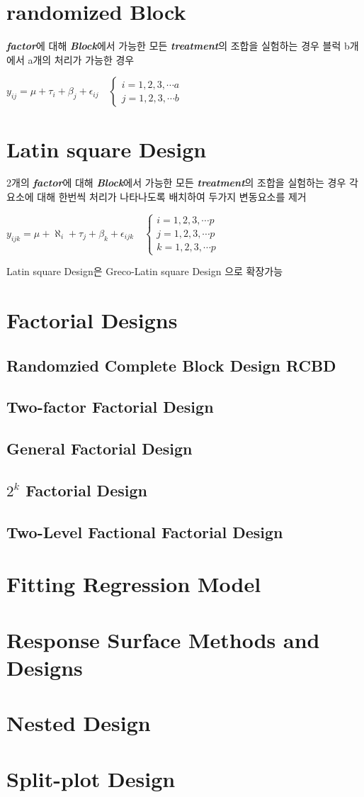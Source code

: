 \documentclass{article}
\begin{document}
    \section{randomized Block}
    \textbf{\textit{factor}}에 대해 \textbf{\textit{Block}}에서 가능한 모든 \textbf{\textit{treatment}}의 조합을 실험하는 경우 
    블럭 b개 에서 a개의 처리가 가능한 경우

    $y_{ij} = \mu+\tau_i+\beta_j+\epsilon_{ij} \quad \left\{
    \begin{matrix}
    i = 1,2,3,\cdots a\\
    j = 1,2,3,\cdots b
    \end{matrix}\right.$
    \section{Latin square Design}
    2개의 \textbf{\textit{factor}}에 대해 \textbf{\textit{Block}}에서 가능한 모든 \textbf{\textit{treatment}}의 조합을 실험하는 경우 
    각 요소에 대해 한번씩 처리가 나타나도록 배치하여 두가지 변동요소를 제거

    $y_{ijk} = \mu+\aleph_i+\tau_j+\beta_k+\epsilon_{ijk} \quad \left\{
    \begin{matrix}
    i = 1,2,3,\cdots p\\
    j = 1,2,3,\cdots p\\
    k = 1,2,3,\cdots p
    \end{matrix}\right.$
    
    Latin square Design은 Greco-Latin square Design 으로 확장가능

    \section{Factorial Designs}
    \subsection{Randomzied Complete Block Design \textbf{RCBD}}
    \subsection{Two-factor Factorial Design}
    \subsection{General Factorial Design}
    \subsection{$2^k$ Factorial Design}
    \subsection{Two-Level Factional Factorial Design}

    \section{Fitting Regression Model}
    \section{Response Surface Methods and Designs}
    \section{Nested Design}
    \section{Split-plot Design}
\end{document}
